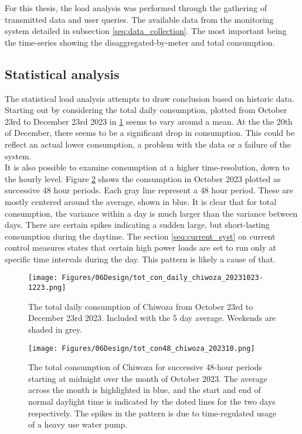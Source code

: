 For this thesis, the load analysis was performed through the gathering of transmitted data and user queries. The available data from the monitoring system detailed in subsection \ref{seq:data_collection}. The most important being the time-series showing the disaggregated-by-meter and total consumption.\\

\subsection{Statistical analysis}

The statistical load analysis attempts to draw conclusion based on historic data. Starting out by considering the total daily consumption, plotted from October 23rd to December 23rd 2023 in \ref{fig:tot_con_daily_chiwoza_20231023-1223}  seems to vary around a mean. At the the 20th of December, there seems to be a significant drop in consumption. This could be reflect an actual lower consumption, a problem with the data or a failure of the system.\\ 

It is also possible to examine consumption at a higher time-resolution, down to the hourly level. Figure \ref{fig:tot_con48_chiwoza_202310} shows the consumption in October 2023 plotted as successive 48 hour periods. Each gray line represent a 48 hour period. These are mostly centered around the average, shown in blue. It is clear that for total consumption, the variance within a day is much larger than the variance between days. There are certain spikes indicating a sudden large, but short-lasting consumption during the daytime. The section \ref{seq:current_syst} on current control measures states that certain high power loads are set to run only at specific time intervals during the day. This pattern is likely a cause of that.\\

\begin{figure}
    \centering
    \texttt{[image: Figures/06Design/tot\_con\_daily\_chiwoza\_20231023-1223.png]}
    \caption[Daily consumption Chiwoza 20231023-1223]{The total daily consumption of Chiwoza from October 23rd to December 23rd 2023. Included with the 5 day average. Weekends are shaded in grey.}
    \label{fig:tot_con_daily_chiwoza_20231023-1223}
\end{figure}

\begin{figure}
    \centering
    \texttt{[image: Figures/06Design/tot\_con48\_chiwoza\_202310.png]}
    \caption[Consumption Chiwoza October successive 48h-periods]{The total consumption of Chiwoza for successive 48-hour periods starting at midnight over the month of October 2023. The average across the month is highlighted in blue, and the start and end of normal daylight time is indicated by the doted lines for the two days respectively. The spikes in the pattern is due to time-regulated usage of a heavy use water pump.}
    \label{fig:tot_con48_chiwoza_202310}
\end{figure}

